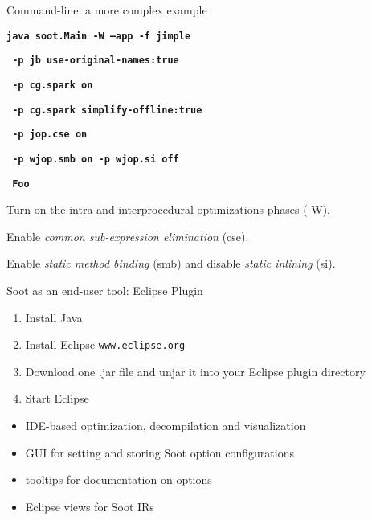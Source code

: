 \begin{slide}{Command-line: a more complex example}

\begin{small}
\textbf{\texttt{java soot.Main {\red -W} --app -f jimple}}

\textbf{\texttt{     -p jb use-original-names:true }}

\textbf{\texttt{     -p cg.spark on }}

\textbf{\texttt{     -p cg.spark simplify-offline:true}}

\textbf{\red\texttt{     -p jop.cse on   }}

\textbf{\red\texttt{     -p wjop.smb on  -p wjop.si off}}

\textbf{\texttt{     Foo }}
\end{small}

\vspace{.1in}

\begin{footnotesize}
Turn on 
the intra and interprocedural optimizations phases (-W). 

Enable \textit{common sub-expression elimination} (cse).

Enable \textit{static method binding} (smb) and disable \textit{static
inlining} (si). 
\end{footnotesize}

\end{slide}

\begin{slide}{Soot as an end-user tool:  Eclipse Plugin}
\vspace{-0.1in}
\begin{small}
\begin{enumerate}
\item Install Java
\item Install Eclipse {\tt www.eclipse.org}
\item Download one .jar file and unjar it into your Eclipse plugin directory 
\item Start Eclipse 
\end{enumerate}

\begin{itemize}
\item IDE-based optimization, decompilation and visualization
\item GUI for setting and storing Soot option configurations
\item tooltips for documentation on options
\item Eclipse views for Soot IRs
\end{itemize}
\end{small}
\end{slide}

